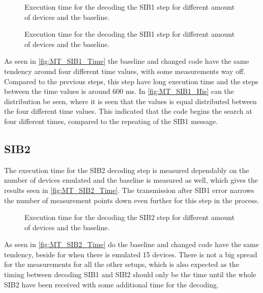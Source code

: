 \begin{minipage}{0.48\textwidth}
\begin{figure}[H]
\centering
\resizebox{0.5\textwidth}{!}{
}
\caption{Execution time for the decoding the SIB1 step for different amount of devices and the baseline.}
\label{fig:MT_SIB1_Time}
\end{figure}
\end{minipage}%
\hfill
\begin{minipage}{0.48\textwidth}
\begin{figure}[H]
\centering
\resizebox{0.5\textwidth}{!}{
}
\caption{Execution time for the decoding the SIB1 step for different amount of devices and the baseline.}
\label{fig:MT_SIB1_His}
\end{figure}
\end{minipage}

As seen in \autoref{fig:MT_SIB1_Time} the baseline and changed code have the same tendency around four different time values, with some measurements way off. Compared to the previous steps, this step have long execution time and the steps between the time values is around 600 ms. In \autoref{fig:MT_SIB1_His} can the distribution be seen, where it is seen that the values is equal distributed between the four different time values. This indicated that the code begins the search at four different times, compared to the repeating of the SIB1 message.


\subsection{SIB2}
The execution time for the SIB2 decoding step is measured dependably on the number of devices emulated and the baseline is measured as well, which gives the results seen in \autoref{fig:MT_SIB2_Time}. The transmission after SIB1 error narrows the number of measurement points down even further for this step in the process.

\begin{figure}[H]
\centering
\resizebox{0.5\textwidth}{!}{
}
\caption{Execution time for the decoding the SIB2 step for different amount of devices and the baseline.}
\label{fig:MT_SIB2_Time}
\end{figure}


As seen in \autoref{fig:MT_SIB2_Time} do the baseline and changed code have the same tendency, beside for when there is emulated 15 devices. There is not a big spread for the measurements for all the other setups, which is also expected as the timing between decoding SIB1 and SIB2 should only be the time until the whole SIB2 have been received with some additional time for the decoding.


